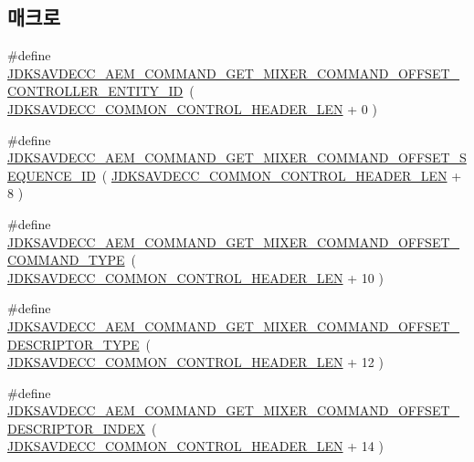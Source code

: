 \subsection*{매크로}
\begin{DoxyCompactItemize}
\item 
\#define \hyperlink{group__command__get__mixer_ga654b9f327b51155d820a1fe65a940179}{J\+D\+K\+S\+A\+V\+D\+E\+C\+C\+\_\+\+A\+E\+M\+\_\+\+C\+O\+M\+M\+A\+N\+D\+\_\+\+G\+E\+T\+\_\+\+M\+I\+X\+E\+R\+\_\+\+C\+O\+M\+M\+A\+N\+D\+\_\+\+O\+F\+F\+S\+E\+T\+\_\+\+C\+O\+N\+T\+R\+O\+L\+L\+E\+R\+\_\+\+E\+N\+T\+I\+T\+Y\+\_\+\+ID}~( \hyperlink{group__jdksavdecc__avtp__common__control__header_gaae84052886fb1bb42f3bc5f85b741dff}{J\+D\+K\+S\+A\+V\+D\+E\+C\+C\+\_\+\+C\+O\+M\+M\+O\+N\+\_\+\+C\+O\+N\+T\+R\+O\+L\+\_\+\+H\+E\+A\+D\+E\+R\+\_\+\+L\+EN} + 0 )
\item 
\#define \hyperlink{group__command__get__mixer_ga82b762c0846bde83562b383b674d3426}{J\+D\+K\+S\+A\+V\+D\+E\+C\+C\+\_\+\+A\+E\+M\+\_\+\+C\+O\+M\+M\+A\+N\+D\+\_\+\+G\+E\+T\+\_\+\+M\+I\+X\+E\+R\+\_\+\+C\+O\+M\+M\+A\+N\+D\+\_\+\+O\+F\+F\+S\+E\+T\+\_\+\+S\+E\+Q\+U\+E\+N\+C\+E\+\_\+\+ID}~( \hyperlink{group__jdksavdecc__avtp__common__control__header_gaae84052886fb1bb42f3bc5f85b741dff}{J\+D\+K\+S\+A\+V\+D\+E\+C\+C\+\_\+\+C\+O\+M\+M\+O\+N\+\_\+\+C\+O\+N\+T\+R\+O\+L\+\_\+\+H\+E\+A\+D\+E\+R\+\_\+\+L\+EN} + 8 )
\item 
\#define \hyperlink{group__command__get__mixer_gaba98dbb05aa68c43723a0302f3c61016}{J\+D\+K\+S\+A\+V\+D\+E\+C\+C\+\_\+\+A\+E\+M\+\_\+\+C\+O\+M\+M\+A\+N\+D\+\_\+\+G\+E\+T\+\_\+\+M\+I\+X\+E\+R\+\_\+\+C\+O\+M\+M\+A\+N\+D\+\_\+\+O\+F\+F\+S\+E\+T\+\_\+\+C\+O\+M\+M\+A\+N\+D\+\_\+\+T\+Y\+PE}~( \hyperlink{group__jdksavdecc__avtp__common__control__header_gaae84052886fb1bb42f3bc5f85b741dff}{J\+D\+K\+S\+A\+V\+D\+E\+C\+C\+\_\+\+C\+O\+M\+M\+O\+N\+\_\+\+C\+O\+N\+T\+R\+O\+L\+\_\+\+H\+E\+A\+D\+E\+R\+\_\+\+L\+EN} + 10 )
\item 
\#define \hyperlink{group__command__get__mixer_ga87945d74b44059916b1722a74cbf5cbd}{J\+D\+K\+S\+A\+V\+D\+E\+C\+C\+\_\+\+A\+E\+M\+\_\+\+C\+O\+M\+M\+A\+N\+D\+\_\+\+G\+E\+T\+\_\+\+M\+I\+X\+E\+R\+\_\+\+C\+O\+M\+M\+A\+N\+D\+\_\+\+O\+F\+F\+S\+E\+T\+\_\+\+D\+E\+S\+C\+R\+I\+P\+T\+O\+R\+\_\+\+T\+Y\+PE}~( \hyperlink{group__jdksavdecc__avtp__common__control__header_gaae84052886fb1bb42f3bc5f85b741dff}{J\+D\+K\+S\+A\+V\+D\+E\+C\+C\+\_\+\+C\+O\+M\+M\+O\+N\+\_\+\+C\+O\+N\+T\+R\+O\+L\+\_\+\+H\+E\+A\+D\+E\+R\+\_\+\+L\+EN} + 12 )
\item 
\#define \hyperlink{group__command__get__mixer_gad21b17d001fae167e07d8864456b11ca}{J\+D\+K\+S\+A\+V\+D\+E\+C\+C\+\_\+\+A\+E\+M\+\_\+\+C\+O\+M\+M\+A\+N\+D\+\_\+\+G\+E\+T\+\_\+\+M\+I\+X\+E\+R\+\_\+\+C\+O\+M\+M\+A\+N\+D\+\_\+\+O\+F\+F\+S\+E\+T\+\_\+\+D\+E\+S\+C\+R\+I\+P\+T\+O\+R\+\_\+\+I\+N\+D\+EX}~( \hyperlink{group__jdksavdecc__avtp__common__control__header_gaae84052886fb1bb42f3bc5f85b741dff}{J\+D\+K\+S\+A\+V\+D\+E\+C\+C\+\_\+\+C\+O\+M\+M\+O\+N\+\_\+\+C\+O\+N\+T\+R\+O\+L\+\_\+\+H\+E\+A\+D\+E\+R\+\_\+\+L\+EN} + 14 )

\end{DoxyCompactItemize}
